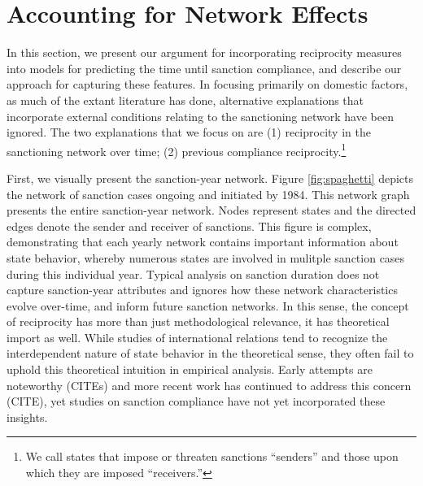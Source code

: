 \section*{Accounting for Network Effects}
\label{neteffects}

In this section, we present our argument for incorporating reciprocity measures into models for predicting the time until sanction compliance, and describe our approach for capturing these features. In focusing primarily on domestic factors, as much of the extant literature has done, alternative explanations that incorporate external conditions relating to the sanctioning network have been ignored. The two explanations that we focus on are (1) reciprocity in the sanctioning network over time; (2) previous compliance reciprocity.\footnote{We call states that impose or threaten sanctions “senders” and those upon which they are imposed “receivers.”}

First, we visually present the sanction-year network. Figure \ref{fig:spaghetti} depicts the network of sanction cases ongoing and initiated by 1984. This network graph presents the entire sanction-year network.  Nodes represent states and the directed edges denote the sender and receiver of sanctions. This figure is complex, demonstrating that each yearly network contains important information about state behavior, whereby numerous states are involved in mulitple sanction cases during this individual year. Typical analysis on sanction duration does not capture sanction-year attributes and ignores how these network characteristics evolve over-time, and inform future sanction networks. In this sense, the concept of reciprocity has more than just methodological relevance, it has theoretical import as well. While studies of international relations tend to recognize the interdependent nature of state behavior in the theoretical sense, they often fail to uphold this theoretical intuition in empirical analysis. Early attempts are noteworthy (CITEs) and more recent work has continued to address this concern (CITE), yet studies on sanction compliance have not yet incorporated these insights. 

